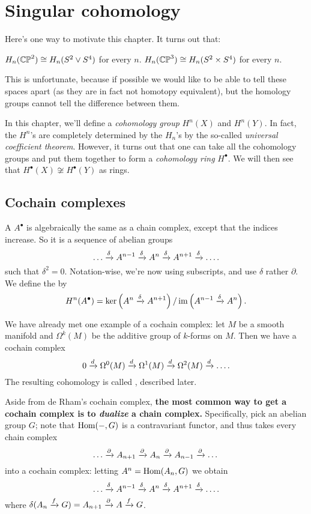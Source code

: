 \chapter{Singular cohomology}
Here's one way to motivate this chapter. It turns out that:
\begin{itemize}
	\ii $H_n(\mathbb{CP}^2) \cong H_n(S^2 \vee S^4)$ for every $n$.
	\ii $H_n(\mathbb{CP}^3) \cong H_n(S^2 \times S^4)$ for every $n$.
\end{itemize}
This is unfortunate, because if possible we would like
to be able to tell these spaces apart (as they are
in fact not homotopy equivalent), but the homology groups 
cannot tell the difference between them.

In this chapter, we'll define a \emph{cohomology group} $H^n(X)$ and $H^n(Y)$.
In fact, the $H^n$'s are completely determined by the $H_n$'s
by the so-called \emph{universal coefficient theorem}.
However, it turns out that one can take all the cohomology groups and put
them together to form a \emph{cohomology ring} $H^\bullet$.
We will then see that $H^\bullet(X) \not\cong H^\bullet(Y)$ as rings.

\section{Cochain complexes}
\begin{definition}
A  $A^\bullet$ is algebraically the same as a chain complex, except that the indices increase.
So it is a sequence of abelian groups
\[ \dots \xrightarrow{\delta} A^{n-1} \xrightarrow{\delta} A^n \xrightarrow{\delta} A^{n+1} \xrightarrow{\delta} \dots. \]
such that $\delta^2 = 0$.
Notation-wise, we're now using subscripts, and use $\delta$ rather $\partial$.
We define the  by
\[ H^n(A^\bullet) = \ker\left( A^n \xrightarrow{\delta} A^{n+1} \right)
	/ \operatorname{im}\left( A^{n-1} \xrightarrow{\delta} A^n \right). \]
\end{definition}

\begin{example}
	We have already met one example of a cochain complex:
	let $M$ be a smooth manifold and $\Omega^k(M)$ be the
	additive group of $k$-forms on $M$.
	Then we have a cochain complex
	\[ 0 \xrightarrow{d} \Omega^0(M)
		\xrightarrow{d} \Omega^1(M) \xrightarrow{d} \Omega^2(M)
		\xrightarrow{d} \dots. \]
	The resulting cohomology is called ,
	described later.
\end{example}

Aside from de Rham's cochain complex,
\textbf{the most common way to get a cochain complex
is to \emph{dualize} a chain complex.}
Specifically, pick an abelian group $G$;
note that $\operatorname{Hom}(-, G)$ is a contravariant functor,
and thus takes every chain complex
\[ \dots \xrightarrow{\partial} A_{n+1} \xrightarrow{\partial}
	A_n \xrightarrow{\partial} A_{n-1} \xrightarrow{\partial} \dots \]
into a cochain complex: letting $A^n = \operatorname{Hom}(A_n, G)$ we obtain
\[ \dots \xrightarrow{\delta} A^{n-1} \xrightarrow{\delta}
	A^n \xrightarrow{\delta} A^{n+1} \xrightarrow{\delta} \dots. \]
where $\delta(A_n \xrightarrow{f} G) = A_{n+1} \xrightarrow{\partial} A \xrightarrow{f} G$.

